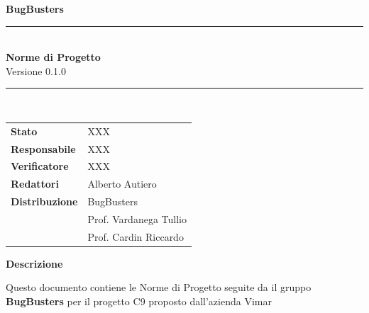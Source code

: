 \documentclass[a4paper,11pt]{article}
\begin{document}
\begin{center}
  \thispagestyle{empty}
  {\LARGE\bfseries BugBusters}\\[0.8cm]
  
  \rule{\textwidth}{0.5pt}\\[0.5cm]
  {\Large\bfseries Norme di Progetto}\\[0.3cm]
  {\large Versione 0.1.0}\\[0.5cm]
  \rule{\textwidth}{0.5pt}\\[0.8cm]
\end{center}

\begin{center}
\begin{tcolorbox}[colback=gray!10,width=0.8\textwidth,arc=3mm,boxrule=0.5pt]
\begin{tabular}{ll}
\textbf{Stato} & XXX \\
\textbf{Responsabile} & XXX \\
\textbf{Verificatore} & XXX \\
\textbf{Redattori} & Alberto Autiero \\
\textbf{Distribuzione} & BugBusters \\
 & Prof. Vardanega Tullio \\
 & Prof. Cardin Riccardo \\
\end{tabular}
\end{tcolorbox}
\end{center}

\vspace{1cm}

\begin{center}
\textbf{Descrizione}
\end{center}

\begin{center}
\begin{minipage}{0.9\textwidth}
\small
Questo documento contiene le Norme di Progetto seguite da il gruppo \textbf{BugBusters} per il progetto C9 proposto dall'azienda Vimar
\end{minipage}
\end{center}
\end{document}
